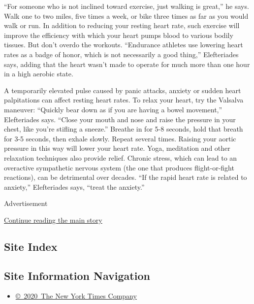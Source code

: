 ``For someone who is not inclined toward exercise, just walking is
great,'' he says. Walk one to two miles, five times a week, or bike
three times as far as you would walk or run. In addition to reducing
your resting heart rate, such exercise will improve the efficiency with
which your heart pumps blood to various bodily tissues. But don't overdo
the workouts. ``Endurance athletes use lowering heart rates as a badge
of honor, which is not necessarily a good thing,'' Elefteriades says,
adding that the heart wasn't made to operate for much more than one hour
in a high aerobic state.

A temporarily elevated pulse caused by panic attacks, anxiety or sudden
heart palpitations can affect resting heart rates. To relax your heart,
try the Valsalva maneuver: ``Quickly bear down as if you are having a
bowel movement,'' Elefteriades says. ``Close your mouth and nose and
raise the pressure in your chest, like you're stifling a sneeze.''
Breathe in for 5-8 seconds, hold that breath for 3-5 seconds, then
exhale slowly. Repeat several times. Raising your aortic pressure in
this way will lower your heart rate. Yoga, meditation and other
relaxation techniques also provide relief. Chronic stress, which can
lead to an overactive sympathetic nervous system (the one that produces
flight-or-fight reactions), can be detrimental over decades. ``If the
rapid heart rate is related to anxiety,'' Elefteriades says, ``treat the
anxiety.''

Advertisement

\protect\hyperlink{after-bottom}{Continue reading the main story}

\hypertarget{site-index}{%
\subsection{Site Index}\label{site-index}}

\hypertarget{site-information-navigation}{%
\subsection{Site Information
Navigation}\label{site-information-navigation}}

\begin{itemize}
\tightlist
\item
  \href{https://help.nytimes3xbfgragh.onion/hc/en-us/articles/115014792127-Copyright-notice}{©~2020~The
  New York Times Company}
\end{itemize}

